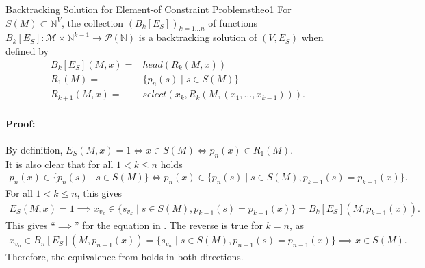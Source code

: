 \begin{theorem}{Backtracking Solution for Element-of Constraint Problems}{theo1}
    For $S(M)\subset\mathbb N^V$, the collection $(B_k[E_S])_{k=1\dots n}$ of
    functions
    $B_k[E_S]\colon\mathcal M\times\mathbb N^{k-1}\rightarrow\mathcal P(\mathbb N)$
    is a backtracking solution of $(V,E_S)$ when defined by
    \begin{align*}
        B_k[E_S](M,x)={}&head(R_k(M,x))\\
        R_1(M)={}&\{p_n(s)\mid s\in S(M)\}\\
        R_{k+1}(M,x)={}&select(x_k,R_k(M,(x_1,\dots,x_{k-1}))).
    \end{align*}
    \tcblower
    \paragraph*{Proof:} By definition,
    $E_S(M,x)=1\iff x\in S(M)\iff p_n(x)\in R_1(M)$.\\
    It is also clear that for all $1<k\leq n$ holds
    \begin{align*}
        p_n(x)\in\{p_n(s)\mid s\in S(M)\}\iff p_n(x)\in\{p_n(s)\mid s\in S(M),p_{k-1}(s)=p_{k-1}(x)\}.
    \end{align*}
    For all $1<k\leq n$, this gives
    \begin{align*}
        E_S(M,x)=1\implies x_{v_k}\in\{s_{v_k}\mid s\in S(M),p_{k-1}(s)=p_{k-1}(x)\}=B_k[E_S](M,p_{k-1}(x)).
    \end{align*}
    This gives ``$\implies$'' for the equation in .
    The reverse is true for $k=n$, as
    \begin{align*}
        x_{v_n}\in B_n[E_S](M,p_{n-1}(x))=\{s_{v_n}\mid s\in S(M),p_{n-1}(s)=p_{n-1}(x)\}\implies x\in S(M).
    \end{align*}
    Therefore, the equivalence from  holds in both directions.
\end{theorem}
